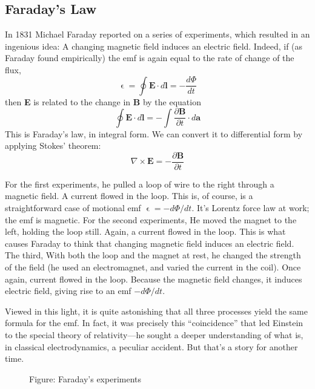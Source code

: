\documentclass[../../../main.tex]{subfiles}
\begin{document}
\subsection{Faraday's Law}
In 1831 Michael Faraday reported on a series of experiments, which resulted in an ingenious idea: A changing magnetic ﬁeld induces an electric ﬁeld. Indeed, if (as Faraday found empirically) the emf is again equal to the rate of change of the ﬂux,
\begin{equation*}
    \upvarepsilon=\oint \mathbf{E}\cdot d\mathbf{l}=-\frac{d\Phi}{dt}
\end{equation*}
then \textbf{E} is related to the change in \textbf{B} by the equation
\begin{equation*}
    \oint \mathbf{E}\cdot d\mathbf{l}=-\int \frac{\partial \mathbf{B}}{\partial t}\cdot d\mathbf{a}
\end{equation*}
This is Faraday's law, in integral form. We can convert it to differential form by
applying Stokes' theorem:
\begin{equation*}
    \nabla\times \mathbf{E}=-\frac{\partial \mathbf{B}}{\partial t}
\end{equation*}

For the first experiments, he pulled a loop of wire to the right through a magnetic ﬁeld. A current ﬂowed in the loop. This is, of course, is a straightforward case of motional emf $\upvarepsilon=-d\Phi/dt$. It’s  Lorentz force law at work; the emf is magnetic. For the second experiments, He moved the magnet to the left, holding the loop still. Again, a current ﬂowed in the loop. This is what causes Faraday to think that changing magnetic ﬁeld induces an electric ﬁeld. The third, With both the loop and the magnet at rest, he changed the strength of the ﬁeld (he used an electromagnet, and varied the current
in the coil). Once again, current ﬂowed in the loop. Because the magnetic field changes, it induces electric field, giving rise to an emf $-d\Phi/dt$.

Viewed in this light, it is quite astonishing that all three processes yield the same formula for the emf. In fact, it was precisely this “coincidence” that led Einstein to the special theory of relativity—he sought a deeper understanding of what is, in classical electrodynamics, a peculiar accident. But that’s a story for another time.
\begin{figure}[b]
    \centering
    \caption*{Figure: Faraday's experiments}
\end{figure}
\end{document}
